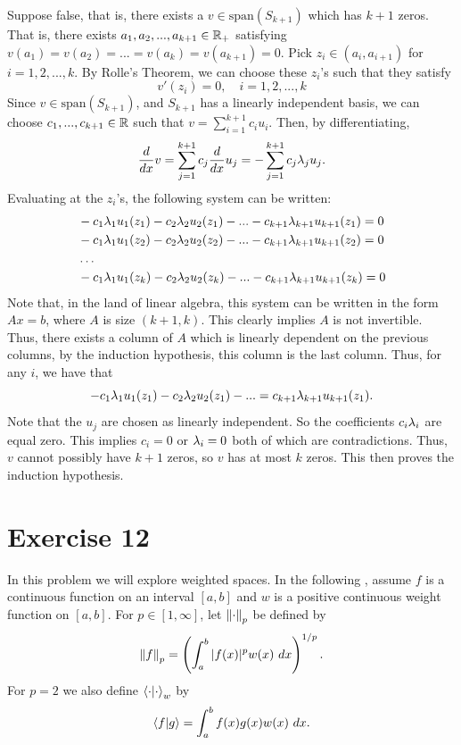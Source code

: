 \begin{solution}
\begin{itemize}
        \hop
        Suppose false, that is, there exists a $v \in \text{span}(S_{k+1})$ which has $k+1$ zeros. That is, there exists $a_1, a_2, ..., a_{k+1} \in \mathbb{R}_+$ satisfying $v(a_1) = v(a_2) = ... = v(a_k) = v(a_{k+1}) = 0$. Pick $z_i \in (a_i, a_{i+1})$ for $i = 1, 2, ..., k$. By Rolle's Theorem, we can choose these $z_i$'s such that they satisfy
        \[v'(z_i) = 0, \quad i = 1, 2, ..., k\]
        Since $v \in \text{span}(S_{k+1})$, and $S_{k+1}$ has a linearly independent basis, we can choose $c_1, ..., c_{k+1} \in \mathbb{R}$ such that $v = \sum_{i = 1}^{k+1} c_i u_i$. Then, by differentiating, 
        \[\frac{d}{dx}v = \sum_{j = 1}^{k+1} c_j \frac{d}{dx}u_j = -\sum_{j = 1}^{k+1} c_j \mathrm{\lambda}_j u_j.\]
        Evaluating at the $z_i$'s, the following system can be written:
        \begin{align*}
            &-c_1\mathrm{\lambda}_1u_1(z_1) - c_2\mathrm{\lambda}_2u_2(z_1) - ... - c_{k+1}\mathrm{\lambda}_{k+1}u_{k+1}(z_1) = 0\\
            &-c_1\mathrm{\lambda}_1u_1(z_2) - c_2\mathrm{\lambda}_2u_2(z_2) - ... - c_{k+1}\mathrm{\lambda}_{k+1}u_{k+1}(z_2) = 0\\
            &\dots\\
            &-c_1\mathrm{\lambda}_1u_1(z_k) - c_2\mathrm{\lambda}_2u_2(z_k) - ... - c_{k+1}\mathrm{\lambda}_{k+1}u_{k+1}(z_k) = 0\\
        \end{align*}
        Note that, in the land of linear algebra, this system can be written in the form $Ax = b$, where $A$ is size $(k+1, k)$. This clearly implies $A$ is not invertible. Thus, there exists a column of $A$ which is linearly dependent on the previous columns, by the induction hypothesis, this column is the last column. Thus, for any $i$, we have that 
        \[-c_1\mathrm{\lambda}_1u_1(z_1) - c_2\mathrm{\lambda}_2u_2(z_1) - ... = c_{k+1}\mathrm{\lambda}_{k+1}u_{k+1}(z_1).\]
        Note that the $u_j$ are chosen as linearly independent. So the coefficients $c_i\mathrm{\lambda}_i$ are equal zero. This implies $c_i = 0$ or $\mathrm{\lambda}_i = 0$ both of which are contradictions. Thus, $v$ cannot possibly have $k+1$ zeros, so $v$ has at most $k$ zeros. This then proves the induction hypothesis. 
    \end{itemize}
\end{solution}

\newpage
\section{Exercise 12}
In this problem we will explore weighted spaces. In the following , assume $f$ is a continuous function on an interval $[a, b]$ and $w$ is a positive continuous weight function on $[a, b]$. For $p \in [1, \infty]$, let $\norm{\cdot}_p$ be defined by 
\[\norm{f}_p = \left(\int_a^b |f(x)|^p w(x) \ dx\right)^{1/p}.\]
For $p = 2$ we also define $\braket{\cdot}{\cdot}_w$ by 
\[\braket{f}{g} = \int_a^b f(x)g(x) w(x) \ dx.\]

